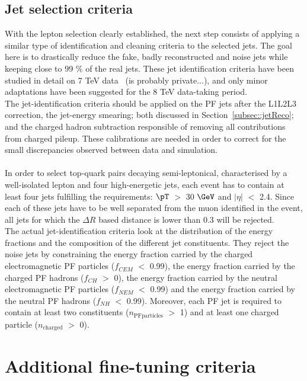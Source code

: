 \subsection{Jet selection criteria}   %
With the lepton selection clearly established, the next step consists of applying a similar type of identification and cleaning criteria to the selected jets.
The goal here is to drastically reduce the fake, badly reconstructed and noise jets while keeping close to 99 $\%$ of the real jets. These jet identification criteria have been studied in detail on 7 TeV data~\cite{JetId7TeV} (is probably private...), and only minor adaptations have been suggested for the 8 TeV data-taking period.
\\
The jet-identification criteria should be applied on the PF jets after the L1L2L3 correction, the jet-energy smearing; both discussed in Section~\ref{subsec::jetReco}; and the charged hadron subtraction responsible of removing all contributions from charged pileup. These calibrations are needed in order to correct for the small discrepancies observed between data and simulation.
\\
\\
In order to select top-quark pairs decaying semi-leptonical, characterised by a well-isolated lepton and four high-energetic jets, each event has to contain at least four jets fulfilling the requirements: $\pT$ $>$ 30 $\GeV$ and $\vert \eta \vert$ $<$ 2.4.
Since each of these jets have to be well separated from the muon identified in the event, all jets for which the $\Delta R$ based distance is lower than 0.3 will be rejected.
\\
The actual jet-identification criteria look at the distribution of the energy fractions and the composition of the different jet constituents.
They reject the noise jets by constraining the energy fraction carried by the charged electromagnetic PF particles ($f_{CEM}$ $<$ 0.99), the energy fraction carried by the charged PF hadrons ($f_{CH}$ $>$ 0), the energy fraction carried by the neutral electromagnetic PF particles ($f_{NEM}$ $<$ 0.99) and the energy fraction carried by the neutral PF hadrons ($f_{NH}$ $<$ 0.99).
Moreover, each PF jet is required to contain at least two constituents ($n_{\textrm{PFparticles}}$ $>$ 1) and at least one charged particle ($n_{\textrm{charged}}$ $>$ 0).

\section{Additional fine-tuning criteria}\label{sec::SpecificSelec}

